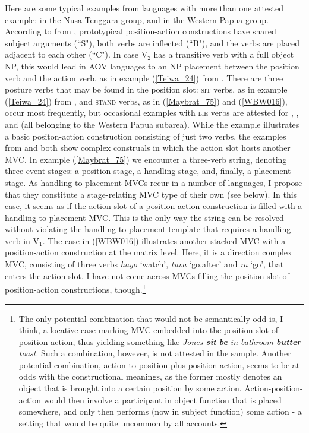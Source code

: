 \largerpage[-2]
Here are some typical examples from languages with more than one attested example:  in the Nusa Tenggara group,  and  in the Western Papua group. According to  from , prototypical position-action constructions have shared subject arguments (``S"), both verbs are inflected (``B"), and the verbs are placed adjacent to each other (``C"). In case V$_2$ has a transitive verb with a full object NP, this would lead in AOV languages to an NP placement between the position verb and the action verb, as in example (\ref{Teiwa_24}) from . There are three posture verbs that may be found in the position slot: \textsc{sit} verbs, as in example (\ref{Teiwa_24}) from , and \textsc{stand} verbs, as in (\ref{Maybrat_75}) and (\ref{WBW016}), occur most frequently, but occasional examples with \textsc{lie} verbs are attested for , , and  (all belonging to the Western Papua subarea). While the  example illustrates a basic positon-action construction consisting of just two verbs, the examples from  and  both show complex construals in which the action slot hosts another MVC. In example (\ref{Maybrat_75}) we encounter a three-verb string, denoting three event stages: a position stage, a handling stage, and, finally, a placement stage. As handling-to-placement MVCs recur in a number of languages, I propose that they constitute a stage-relating MVC type of their own (see  below). In this case, it seems as if the action slot of a position-action construction is filled with a handling-to-placement MVC. This is the only way the string can be resolved without violating the handling-to-placement template that requires a handling verb in V$_1$. The  case in (\ref{WBW016}) illustrates another stacked MVC with a position-action construction at the matrix level. Here, it is a direction complex MVC, consisting of three verbs \textit{hayo} `watch', \textit{tuva} `go.after' and \textit{ra} `go', that enters the action slot. I have not come across MVCs filling the position slot of position-action constructions, though.\footnote{The only potential combination that would not be semantically odd is, I think, a locative case-marking MVC embedded into the position slot of position-action, thus yielding something like \textit{Jones \textbf{sit} \textbf{be} in bathroom \textbf{butter} toast}. Such a combination, however, is not attested in the sample. Another potential combination, action-to-position plus position-action, seems to be at odds with the constructional meanings, as the former mostly denotes an object that is brought into a certain position by some action. Action-position-action would then involve a participant in object function that is placed somewhere, and only then performs (now in subject function) some action - a setting that would be quite uncommon by all accounts.}

